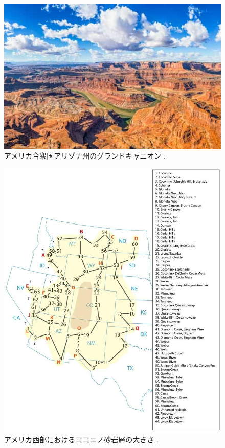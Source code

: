 \documentclass[10pt,twocolumn,letterpaper]{article}
\begin{document}
\begin{figure}[t]
\begin{center}
   \includegraphics[width=1\linewidth]{grand-canyon.jpg}
\end{center}
   \caption{アメリカ合衆国アリゾナ州のグランドキャニオン \cite{49}.}
\label{fig:2}
\label{fig:onecol}
\end{figure}

\begin{figure}[t]

\begin{center}
   \includegraphics[width=1\linewidth]{coconino.jpg}
\end{center}
   \caption{アメリカ西部におけるココニノ砂岩層の大きさ \cite{21}.}
\label{fig:3}
\label{fig:onecol}
\end{figure}
\end{document}
